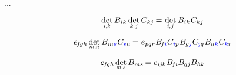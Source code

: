 ...


\nopagebreak\vspace{-0.2em}\begin{equation}\label{determinantofmatrixproduct}
\underset{\raisebox{.15em}{\scalebox{.7}{$i$,$k$}}}{\operatorname{det}} \, B_{ik} \hspace{.4ex} \underset{\raisebox{.15em}{\scalebox{.7}{$k$,$\hspace{.15ex}j$}}}{\operatorname{det}} \, C_{kj} \hspace{-0.15ex}
= \hspace{.1ex} \underset{\raisebox{.15em}{\scalebox{.7}{$i$,$\hspace{.15ex}j$}}}{\operatorname{det}} \, B_{ik} \hspace{.1ex} C_{kj}
\end{equation}

\[
e_{\hspace{-0.25ex}f\hspace{-0.2ex}gh} \hspace{.33ex} \underset{\raisebox{.15em}{\scalebox{.7}{$m$,$n$}}}{\operatorname{det}} \, B_{m\mathcolor{blue}{s}} \hspace{.1ex} C_{\mathcolor{blue}{s}n} \hspace{-0.2ex}
= e_{pqr} \hspace{.1ex} B_{\hspace{-0.25ex}f\hspace{-0.1ex}\mathcolor{blue}{i}} C_{\mathcolor{blue}{i}p} \hspace{.1ex} B_{\hspace{-0.1ex}g\mathcolor{blue}{j}} C_{\hspace{-0.1ex}\mathcolor{blue}{j}\hspace{-0.1ex}q} \hspace{.1ex} B_{h\mathcolor{blue}{k}} C_{\mathcolor{blue}{k}r}
\hspace{-0.2ex}
\]

\[
e_{\hspace{-0.25ex}f\hspace{-0.2ex}gh} \hspace{.33ex} \underset{\raisebox{.15em}{\scalebox{.7}{$m$,$s$}}}{\operatorname{det}} \, B_{ms} \hspace{-0.2ex}
= e_{i\hspace{-0.1ex}j\hspace{-0.1ex}k} \hspace{.1ex} B_{\hspace{-0.25ex}f\hspace{-0.1ex}i} B_{\hspace{-0.1ex}gj} B_{hk}
\hspace{-0.2ex}
\]


